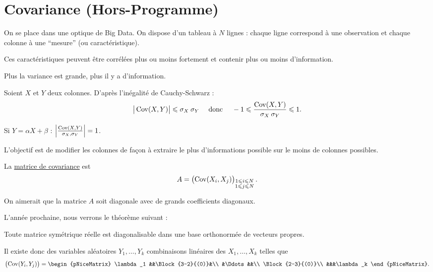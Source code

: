 \part{Covariance ({\sc Hors-Programme})}

On se place dans une optique de Big Data.
On dispose d'un tableau à $N$ lignes : chaque ligne correspond à une observation et chaque colonne à une ``mesure'' (ou caractéristique).

Ces caractéristiques peuvent être corrélées plus ou moins fortement et contenir plus ou moins d'information.

Plus la variance est grande, plus il y a d'information.

Soient $X$ et $Y$ deux colonnes. D'après l'inégalité de Cauchy-Schwarz : \[
	\big|\operatorname{Cov}(X,Y)\big| \leqslant \sigma_X\:\sigma_Y \quad \text{ donc } \quad -1 \leqslant \frac{\operatorname{Cov}(X,Y)}{\sigma_X\:\sigma_Y} \leqslant 1
.\]

Si $Y = \alpha X + \beta$ : \hfill$\left| \frac{\operatorname{Cov}(X,Y)}{\sigma_X,\sigma_Y} \right| = 1$.\hfill~\hfill~

L'objectif est de modifier les colonnes de fa\c con à extraire le plus d'informations possible sur le moins de colonnes possibles.

La \underline{matrice de covariance} est \[
	A = \begin{pmatrix}
		\operatorname{Cov}(X_i,X_j)
	\end{pmatrix}_{\substack{1\leqslant i\leqslant N\\1\leqslant j\leqslant N}}
.\]

On aimerait que la matrice $A$ soit diagonale avec de grands coefficients diagonaux.

L'année prochaine, nous verrons le théorème suivant :
\begin{thm}
	Toute matrice symétrique réelle est diagonalisable dans une base orthonormée de vecteurs propres.
\end{thm}

Il existe donc des variables aléatoires $Y_1, \ldots, Y_k$ combinaisons linéaires des $X_1, \ldots, X_k$ telles que \[
	\begin{pmatrix}
		\Cov(Y_i,Y_j)
	\end{pmatrix} =
	\begin{pNiceMatrix}
		\lambda_1 &&\Block{3-2}{(0)}&\\
		&\Ddots&&\\
		\Block{2-3}{(0)}\\
		&&&\lambda_k
	\end{pNiceMatrix}
.\]

